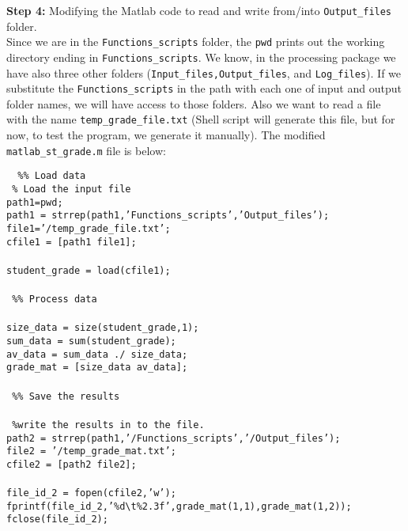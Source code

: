 \noindent
\textbf{Step 4:} Modifying the Matlab code to read and write from/into \texttt{Output\_files} folder.\\
\noindent
Since we are in the \texttt{Functions\_scripts} folder, the \texttt{pwd} prints out the working directory ending in \texttt{Functions\_scripts}. We know, in the processing package we have also three other folders (\texttt{Input\_files,Output\_files}, and \texttt{Log\_files}). If we substitute the  \texttt{Functions\_scripts} in the path with each one of input and output folder names, we will have access to those folders. Also we want to read a file with the name \texttt{temp\_grade\_file.txt} (Shell script will generate this file, but for now, to test the program, we generate it manually). The modified \texttt{matlab\_st\_grade.m} file is below:

 \begin{mdframed}[hidealllines=true,backgroundcolor=gray!20]
 \begin{singlespace}
 \fontsize{10pt}{1pt}
 \texttt{
{ \color{matlab_green}\%\% Load data}\\
{ \color{matlab_green}\% Load the input file}\\
path1=pwd;\\
path1 = strrep(path1,{\color{matlab_pink}'Functions\_scripts'},{\color{matlab_pink}'Output\_files'}); \\
file1={\color{matlab_pink}'/temp\_grade\_file.txt'};\\
cfile1 = [path1 file1];\\
\\
student\_grade = load(cfile1);\\
\\
{ \color{matlab_green}\%\% Process data}\\
\\
size\_data = size(student\_grade,1);\\
sum\_data = sum(student\_grade);\\
av\_data = sum\_data ./ size\_data;\\
grade\_mat = [size\_data av\_data];\\
\\
{ \color{matlab_green}\%\% Save the results}\\
\\
{ \color{matlab_green}\%write the results in to the file.} \\
path2 = strrep(path1,{\color{matlab_pink}'/Functions\_scripts'},{\color{matlab_pink}'/Output\_files'});\\ 
file2 = {\color{matlab_pink}'/temp\_grade\_mat.txt'};\\
cfile2 = [path2 file2];\\
\\
file\_id\_2 = fopen(cfile2,{\color{matlab_pink}'w'});\\
fprintf(file\_id\_2,{\color{matlab_pink}'\%d\textbackslash t\%2.3f'},grade\_mat(1,1),grade\_mat(1,2));\\
fclose(file\_id\_2);
}
\end{singlespace}
\end{mdframed}
